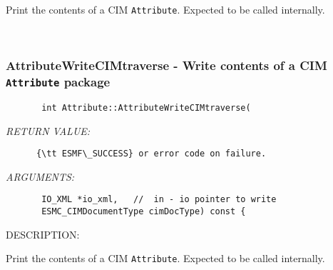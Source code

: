       Print the contents of a CIM {\tt Attribute}.  Expected to be
      called internally.
   
 
\mbox{}\hrulefill\
 
\subsubsection [AttributeWriteCIMtraverse] {AttributeWriteCIMtraverse - Write contents of a CIM {\tt Attribute} package}


  
\begin{verbatim}       int Attribute::AttributeWriteCIMtraverse(\end{verbatim}{\em RETURN VALUE:}
\begin{verbatim}      {\tt ESMF\_SUCCESS} or error code on failure.\end{verbatim}{\em ARGUMENTS:}
\begin{verbatim}       IO_XML *io_xml,   //  in - io pointer to write
       ESMC_CIMDocumentType cimDocType) const {\end{verbatim}
{\sf DESCRIPTION:\\ }


      Print the contents of a CIM {\tt Attribute}.  Expected to be
      called internally.
  
\setlength{\parskip}{\oldparskip}
\setlength{\parindent}{\oldparindent}
\setlength{\baselineskip}{\oldbaselineskip}
